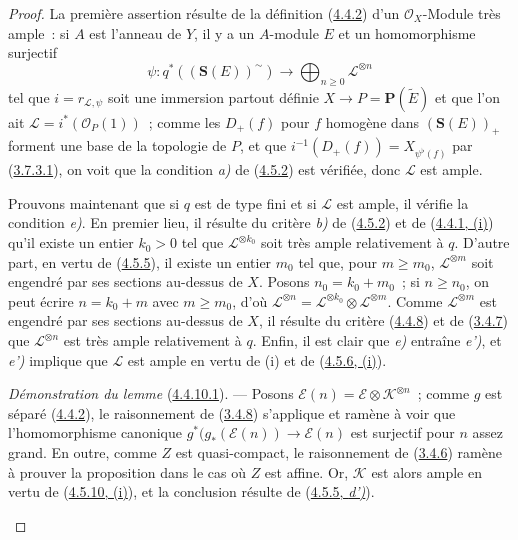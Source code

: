 \begin{proof}
La première assertion résulte de la définition
(\hyperref[II.4.4.2-fr]{4.4.2}) d'un $\mathcal{O}_X$-Module très ample~: si
$A$ est l'anneau de $Y$, il y a un $A$-module $E$ et un homomorphisme
surjectif
\[
  \psi:q^*((\mathbf{S}(E))^{\sim})\longrightarrow
  \bigoplus_{n\geq0}\mathcal{L}^{\otimes n}
\]
tel que $i=r_{\mathcal{L},\psi}$ soit une immersion partout définie
$X\to P=\mathbf{P}(\widetilde{E})$ et que l'on ait
$\mathcal{L}=i^*(\mathcal{O}_P(1))$~; comme les $D_+(f)$ pour $f$ homogène
dans $(\mathbf{S}(E))_+$ forment une base de la topologie de $P$, et que
$i^{-1}(D_+(f))=X_{\psi^\flat(f)}$ par
(\hyperref[II.3.7.3.1-fr]{3.7.3.1}), on voit que la condition \emph{a)} de
(\hyperref[II.4.5.2-fr]{4.5.2}) est vérifiée, donc $\mathcal{L}$ est ample.

Prouvons maintenant que si $q$ est de type fini et si $\mathcal{L}$ est
ample, il vérifie la condition \emph{e)}. En premier lieu, il résulte du critère \emph{b)}
de (\hyperref[II.4.5.2-fr]{4.5.2}) et de
(\hyperref[II.4.4.1-fr]{4.4.1, (i)}) qu'il existe
un entier $k_0>0$ tel que $\mathcal{L}^{\otimes k_0}$ soit très ample
relativement à $q$. D'autre part, en vertu de
(\hyperref[II.4.5.5-fr]{4.5.5}), il existe un entier $m_0$ tel que, pour
$m\geq m_0$, $\mathcal{L}^{\otimes m}$ soit engendré par ses sections
au-dessus de $X$. Posons $n_0=k_0+m_0$~; si $n\geq n_0$, on peut écrire
$n=k_0+m$ avec $m\geq m_0$, d'où
$\mathcal{L}^{\otimes n}
=\mathcal{L}^{\otimes k_0}\otimes\mathcal{L}^{\otimes m}$. Comme
$\mathcal{L}^{\otimes m}$ est engendré par ses sections au-dessus de $X$, il
résulte du critère (\hyperref[II.4.4.8-fr]{4.4.8}) et de
(\hyperref[II.3.4.7-fr]{3.4.7}) que $\mathcal{L}^{\otimes n}$ est très ample
relativement à $q$. Enfin, il est clair que \emph{e)} entraîne \emph{e')}, et \emph{e')} implique
que $\mathcal{L}$ est ample en vertu de (i) et de
(\hyperref[II.4.5.6-fr]{4.5.6, (i)}).

\begin{env}[4.5.10.1]
\label{II.4.5.10.1-fr}
\emph{Démonstration du lemme} (\hyperref[II.4.4.10.1-fr]{4.4.10.1}). --- Posons
$\mathcal{E}(n)=\mathcal{E}\otimes\mathcal{K}^{\otimes n}$~; comme $g$ est
séparé (\hyperref[II.4.4.2-fr]{4.4.2}), le raisonnement de
(\hyperref[II.3.4.8-fr]{3.4.8}) s'applique et ramène à voir que
l'homomorphisme canonique
$g^*(g_*(\mathcal{E}(n))\to\mathcal{E}(n)$ est surjectif pour $n$ assez
grand. En outre, comme $Z$ est quasi-compact, le raisonnement de
(\hyperref[II.3.4.6-fr]{3.4.6}) ramène à prouver la proposition dans le cas
où $Z$ est affine. Or, $\mathcal{K}$ est alors ample en vertu de
(\hyperref[II.4.5.10-fr]{4.5.10, (i)}), et la conclusion résulte de
(\hyperref[II.4.5.5-fr]{4.5.5, \emph{d')}}).
\end{env}
\end{proof}

